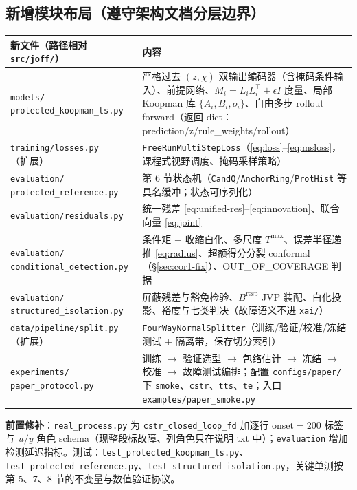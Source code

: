 \documentclass[11pt,a4paper]{ctexart}
\theoremstyle{remark}
\begin{document}
\subsection{新增模块布局（遵守架构文档分层边界）}

\begin{center}
\small
\begin{tabular}{L{0.30\textwidth}L{0.58\textwidth}}
\toprule
新文件（路径相对 \texttt{src/joff/}） & 内容 \\
\midrule
\texttt{models/} \texttt{protected\_koopman\_ts.py} & 严格过去 $(z,\chi)$ 双输出编码器（含掩码条件输入）、前提网络、$M_i=L_iL_i^\top+\epsilon I$ 度量、局部 Koopman 库 $\{A_i,B_i,o_i\}$、自由多步 rollout forward（返回 dict：prediction/z/rule\_weights/rollout） \\
\texttt{training/losses.py}（扩展） & \texttt{FreeRunMultiStepLoss}（\eqref{eq:loss}--\eqref{eq:msloss}，课程式视野调度、掩码采样策略） \\
\texttt{evaluation/} \texttt{protected\_reference.py} & 第 6 节状态机（\texttt{CandQ}/\texttt{AnchorRing}/\texttt{ProtHist} 等具名缓冲；状态可序列化） \\
\texttt{evaluation/residuals.py} & 统一残差 \eqref{eq:unified-res}--\eqref{eq:innovation}、联合向量 \eqref{eq:joint} \\
\texttt{evaluation/} \texttt{conditional\_detection.py} & 条件矩 + 收缩白化、多尺度 $T^{\max}$、误差半径递推 \eqref{eq:radius}、超额得分分裂 conformal（\S\ref{sec:cor1-fix}）、OUT\_OF\_COVERAGE 判据 \\
\texttt{evaluation/} \texttt{structured\_isolation.py} & 屏蔽残差与豁免检验、$B^{\mathrm{resp}}$ JVP 装配、白化投影、裕度与七类判决（故障语义不进 \texttt{xai/}） \\
\texttt{data/pipeline/split.py}（扩展） & \texttt{FourWayNormalSplitter}（训练/验证/校准/冻结测试 + 隔离带，保存切分索引） \\
\texttt{experiments/} \texttt{paper\_protocol.py} & 训练 $\to$ 验证选型 $\to$ 包络估计 $\to$ 冻结 $\to$ 校准 $\to$ 故障测试编排；配置 \texttt{configs/paper/} 下 \texttt{smoke}、\texttt{cstr}、\texttt{tts}、\texttt{te}；入口 \texttt{examples/paper\_smoke.py} \\
\bottomrule
\end{tabular}
\end{center}

\textbf{前置修补}：\texttt{real\_process.py} 为 \texttt{cstr\_closed\_loop\_fd} 加逐行 onset$=200$ 标签与 $u/y$ 角色 schema（现整段标故障、列角色只在说明 txt 中）；\texttt{evaluation} 增加检测延迟指标。测试：\texttt{test\_protected\_koopman\_ts.py}、\texttt{test\_protected\_reference.py}、\texttt{test\_structured\_isolation.py}，关键单测按第 5、7、8 节的不变量与数值验证协议。
\end{document}
